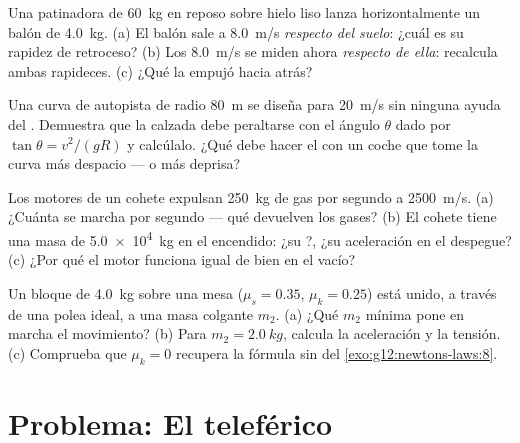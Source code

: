\begin{exercise}[$\star\star\star$]\label{exo:g12:newtons-laws:12}
Una patinadora de \qty{60}{kg} en reposo sobre hielo liso lanza horizontalmente un
balón de \qty{4.0}{kg}. (a) El balón sale a \qty{8.0}{m/s} \emph{respecto del suelo}:
¿cuál es su rapidez de retroceso? (b) Los \qty{8.0}{m/s} se miden ahora \emph{respecto
de ella}: recalcula ambas rapideces. (c) ¿Qué  la empujó hacia atrás?
\end{exercise}

\begin{exercise}[$\star\star\star$]\label{exo:g12:newtons-laws:13}
Una curva de autopista de radio \qty{80}{m} se diseña para \qty{20}{m/s} sin ninguna
ayuda del . Demuestra que la calzada debe peraltarse con el ángulo $\theta$
dado por $\tan\theta = v^2/(gR)$ y calcúlalo. ¿Qué debe hacer el  con un
coche que tome la curva más despacio --- o más deprisa?
\end{exercise}

\begin{exercise}[$\star\star\star$]\label{exo:g12:newtons-laws:14}
Los motores de un cohete expulsan \qty{250}{kg} de gas por segundo a \qty{2500}{m/s}.
(a) ¿Cuánta  se marcha por segundo --- qué  devuelven los
gases? (b) El cohete tiene una masa de \qty{5.0e4}{kg} en el encendido: ¿su ?, ¿su
aceleración en el despegue? (c) ¿Por qué el motor funciona igual de bien en el vacío?
\end{exercise}

\begin{exercise}[$\star\star\star$]\label{exo:g12:newtons-laws:15}
Un bloque de \qty{4.0}{kg} sobre una mesa ($\mu_s = 0.35$, $\mu_k = 0.25$) está unido,
a través de una polea ideal, a una masa colgante $m_2$. (a) ¿Qué $m_2$ mínima pone en
marcha el movimiento? (b) Para $m_2 = \qty{2.0}{kg}$, calcula la aceleración y la
tensión. (c) Comprueba que $\mu_k = 0$ recupera la fórmula sin  del
\cref{exo:g12:newtons-laws:8}.
\end{exercise}

\section{Problema: El teleférico}

